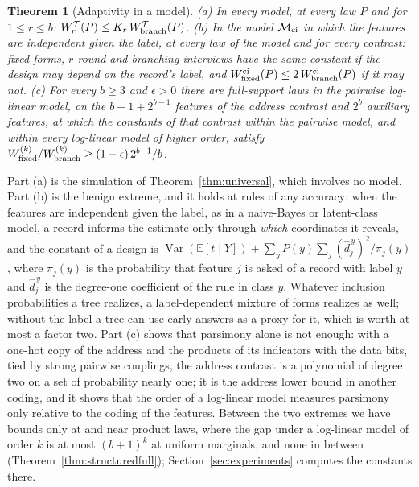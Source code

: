 \documentclass{article}
\newtheorem{theorem}{Theorem}
\newcommand{\E}{\mathbb{E}}
\newcommand{\Var}{\operatorname{Var}}
\begin{document}
\begin{theorem}[Adaptivity in a model]\label{thm:structured}
\textup{(a)} In every model, at every law $P$ and for $1\le r\le b$: $W^{\mathcal T}_r(P)\le K_r\,W^{\mathcal T}_{\rm branch}(P)$.
\textup{(b)} In the model $\mathcal M_{\rm ci}$ in which the features are independent given the label, at every law of the model and for every contrast: fixed forms, $r$-round and branching interviews have the same constant if the design may depend on the record's label, and $W^{\rm ci}_{\rm fixed}(P)\le2\,W^{\rm ci}_{\rm branch}(P)$ if it may not.
\textup{(c)} For every $b\ge3$ and $\epsilon>0$ there are full-support laws in the pairwise log-linear model, on the $b-1+2^{b-1}$ features of the address contrast and $2^b$ auxiliary features, at which the constants of that contrast within the pairwise model, and within every log-linear model of higher order, satisfy $W^{(k)}_{\rm fixed}/W^{(k)}_{\rm branch}\ge(1-\epsilon)\,2^{b-1}/b$.
\end{theorem}
Part (a) is the simulation of Theorem~\ref{thm:universal}, which involves no model. Part (b) is the benign extreme, and it holds at rules of any accuracy: when the features are independent given the label, as in a naive-Bayes or latent-class model, a record informs the estimate only through \emph{which} coordinates it reveals, and the constant of a design is $\Var(\E[t\mid Y])+\sum_yP(y)\sum_j(\hat d^{\,y}_j)^2/\pi_j(y)$, where $\pi_j(y)$ is the probability that feature $j$ is asked of a record with label $y$ and $\hat d^{\,y}_j$ is the degree-one coefficient of the rule in class $y$. Whatever inclusion probabilities a tree realizes, a label-dependent mixture of forms realizes as well; without the label a tree can use early answers as a proxy for it, which is worth at most a factor two. Part (c) shows that parsimony alone is not enough: with a one-hot copy of the address and the products of its indicators with the data bits, tied by strong pairwise couplings, the address contrast is a polynomial of degree two on a set of probability nearly one; it is the address lower bound in another coding, and it shows that the order of a log-linear model measures parsimony only relative to the coding of the features. Between the two extremes we have bounds only at and near product laws, where the gap under a log-linear model of order $k$ is at most $(b+1)^k$ at uniform marginals, and none in between (Theorem~\ref{thm:structuredfull}); Section~\ref{sec:experiments} computes the constants there.


\end{document}
